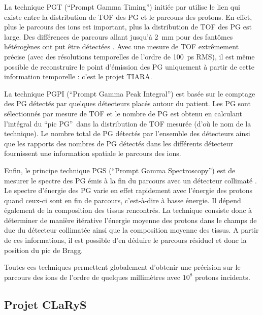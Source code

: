 \documentclass[11pt,a4paper,oldfontcommands]{memoir}
\begin{document}
La technique PGT (\enquote{Prompt Gamma Timing}) initiée par \cite{Golnik_2014} utilise le lien qui existe entre la distribution de TOF des PG et le parcours des protons. En effet, plus le parcours des ions est important, plus la distribution de TOF des PG est large. Des différences de parcours allant jusqu'à 2~mm pour des fantômes hétérogènes ont put être détectées \cite{Hueso_Gonz_lez_2015}. Avec une mesure de TOF extrêmement précise (avec des résolutions temporelles de l'ordre de 100~ps RMS), il est même possible de reconstruire le point d'émission des PG uniquement à partir de cette information temporelle : c'est le projet TIARA.

La technique PGPI (\enquote{Prompt Gamma Peak Integral}) est basée sur le comptage des PG détectés par quelques détecteurs placés autour du patient. Les PG sont sélectionnés par mesure de TOF et le nombre de PG est obtenu en calculant l'intégral du \enquote{pic PG} dans la distribution de TOF mesurée (d'où le nom de la technique). Le nombre total de PG détectés par l'ensemble des détecteurs ainsi que les rapports des nombres de PG détectés dans les différents détecteur fournissent une information spatiale le parcours des ions.

Enfin, le principe technique PGS (\enquote{Prompt Gamma Spectroscopy}) est de mesurer le spectre des PG émis à la fin du parcours avec un détecteur collimaté \cite{Testa_2014}.  Le spectre d'énergie des PG varie en effet rapidement avec l'énergie des protons quand ceux-ci sont en fin de parcours, c'est-à-dire à basse énergie. Il dépend également de la composition des tissus rencontrés. La technique consiste donc à déterminer de manière itérative l'énergie moyenne des protons dans le champs de due du détecteur collimatée ainsi que la composition moyenne des tissus. A partir de ces informations, il est possible d'en déduire le parcours résiduel et donc la position du pic de Bragg. 

Toutes ces techniques permettent globalement d'obtenir une précision sur le parcours des ions de l'ordre de quelques millimètres avec $10^8$ protons incidents.

\subsection{Projet CLaRyS}
\end{document}
